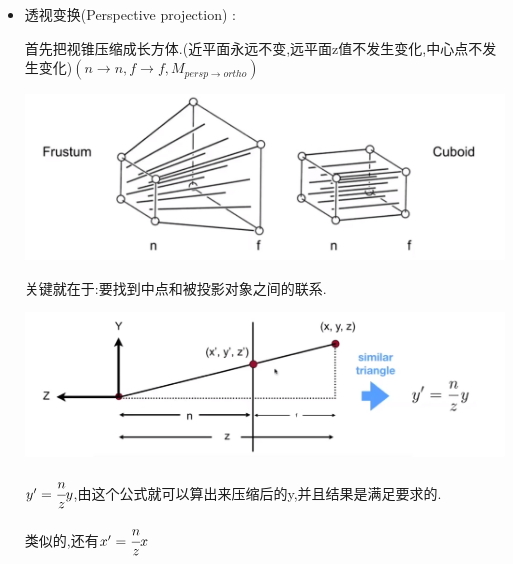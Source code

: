 {{{\begin{itemize}
{\begin{itemize}
{                      \begin{itemize}
                        \item 注意:由于视线方向沿着-z,所以$n>f$
                        \item 这就是为啥OpenGL用的是左手系
                      \end{itemize}
                      }
                \item {
                      透视变换(Perspective projection) :

                      首先把视锥压缩成长方体.(近平面永远不变,远平面z值不发生变化,中心点不发生变化)$(n \to n,f \to f,M_{persp \to ortho})$

                      \includegraphics[scale=0.5]{resources/perspectiveProjection.png}

                      关键就在于:要找到中点和被投影对象之间的联系.

                      \includegraphics[scale=0.5]{resources/perspectiveProjection_middle.png}

                      $y^\prime = \cfrac{n}{z}y$,由这个公式就可以算出来压缩后的y,并且结果是满足要求的.

                      类似的,还有$x^\prime = \cfrac{n}{z}x$

}
\end{itemize}}
\end{itemize}}}}
